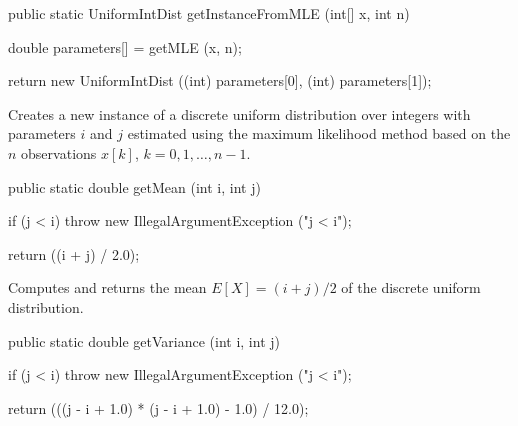 \begin{htmlonly}
\end{htmlonly}
\begin{code}

   public static UniformIntDist getInstanceFromMLE (int[] x, int n)\begin{hide} {

      double parameters[] = getMLE (x, n);

      return new UniformIntDist ((int) parameters[0], (int) parameters[1]);
   }\end{hide}
\end{code}
\begin{tabb}
   Creates a new instance of a discrete uniform distribution over integers with parameters
   $i$ and $j$ estimated using the maximum likelihood method based on the $n$ observations
   $x[k]$, $k = 0, 1, \ldots, n-1$.
\end{tabb}
\begin{htmlonly}
\end{htmlonly}
\begin{code}

   public static double getMean (int i, int j)\begin{hide} {
      if (j < i)
        throw new IllegalArgumentException ("j < i");

      return ((i + j) / 2.0);
   }\end{hide}
\end{code}
\begin{tabb}  Computes and returns the mean $E[X] = (i + j)/2$
   of the discrete uniform distribution.
\end{tabb}
\begin{htmlonly}
\end{htmlonly}
\begin{code}

   public static double getVariance (int i, int j)\begin{hide} {
      if (j < i)
        throw new IllegalArgumentException ("j < i");

      return (((j - i + 1.0) * (j - i + 1.0) - 1.0) / 12.0);
   }\end{hide}
\end{code}
